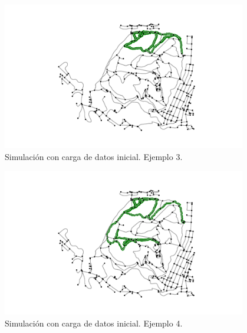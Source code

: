 \begin{figure}[h]
\begin{center}
\includegraphics[width=0.95\textwidth]{./Imagenes/data-simulation/track3.png}
\caption{Simulación con carga de datos inicial. Ejemplo 3.}
\end{center}
\label{figure:Simulation3}
\end{figure}

\begin{figure}[h]
\begin{center}
\includegraphics[width=0.95\textwidth]{./Imagenes/data-simulation/track4.png}
\caption{Simulación con carga de datos inicial. Ejemplo 4.}
\end{center}
\label{figure:Simulation4}
\end{figure}
\newpage

